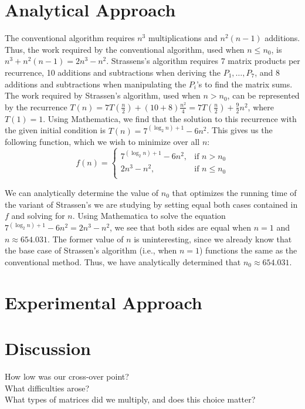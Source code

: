 \documentclass[solution, letterpaper]{cs121}
\begin{document}

\section*{Analytical Approach}

\hspace{4mm} The conventional algorithm requires $n^3$ multiplications and $n^2(n-1)$ additions. Thus, the work required by the conventional algorithm, used when $n \leq n_0$, is $n^3 + n^2(n-1) = 2n^3 - n^2$. Strassens's algorithm requires 7 matrix products per recurrence, 10 additions and subtractions when deriving the $P_1, \ldots, P_7$, and 8 additions and subtractions when manipulating the $P_i$'s to find the matrix sums. The work required by Strassen's algorithm, used when $n > n_0$, can be represented by the recurrence $T(n) = 7T(\frac{n}{2}) + (10+8)\frac{n^2}{4} = 7T(\frac{n}{2}) + \frac{9}{2}n^2$, where $T(1) = 1$. Using Mathematica, we find that the solution to this recurrence with the given initial condition is $T(n) = 7^{(\log_2 n) + 1}-6 n^2$. This gives us the following function, which we wish to minimize over all $n$:
\[
    f(n)= 
\begin{cases}
    7^{(\log_2 n) + 1}-6 n^2, & \text{if } n > n_0 \\
    2n^3 - n^2, & \text{if } n \leq n_0\\
\end{cases}
\]

We can analytically determine the value of $n_0$ that optimizes the running time of the variant of Strassen's we are studying by setting equal both cases contained in $f$ and solving for $n$. Using Mathematica to solve the equation $7^{(\log_2 n) + 1}-6 n^2 = 2n^3 - n^2$, we see that both sides are equal when $n = 1$ and $n \approx 654.031$. The former value of $n$ is uninteresting, since we already know that the base case of Strassen's algorithm (i.e., when $n=1$) functions the same as the conventional method. Thus, we have analytically determined that $n_0 \approx 654.031$.

\section*{Experimental Approach}

\section*{Discussion}

How low was our cross-over point? \\
What difficulties arose? \\
What types of matrices did we multiply, and does this choice matter? \\
\end{document}
